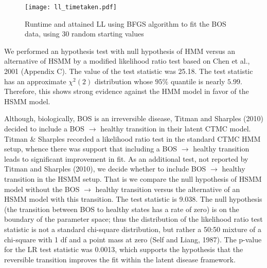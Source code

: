 \documentclass{uwstat572}
\begin{document}
\begin{table}
\centering
{}
\vspace{2mm}
\caption{This is a demonstration of non-identifiability of the likelihood for the BOS dataset. Two different parameter sets lead to approximately the same likelihood.}
\end{table}
\begin{figure}
\centering
\texttt{[image: ll\_timetaken.pdf]}
\caption{Runtime and attained LL using BFGS algorithm to fit the BOS data, using 30 random starting values}
\end{figure}


We performed an hypothesis test with null hypothesis of HMM versus an alternative of HSMM by a modified likelihood ratio test based on Chen et al., 2001 (Appendix C). The value of the test statistic was 25.18. The test statistic has an approximate $\chi^2(2)$ distribution whose $95\%$ quantile is nearly $5.99$. Therefore, this shows strong evidence against the HMM model in favor of the HSMM model.

Although, biologically, BOS is an irreversible disease, Titman and Sharples (2010) decided to include a BOS $\rightarrow$ healthy transition in their latent CTMC model. Titman \& Sharples recorded a likelihood ratio test in the standard CTMC HMM setup, whence there was support that including a BOS $\rightarrow$ healthy transition leads to significant improvement in fit. As an additional test, not reported by Titman and Sharples (2010), we decide whether to include BOS $\rightarrow$ healthy transition in the HSMM setup. That is we compare the null hypothesis of HSMM model without the BOS $\rightarrow$ healthy transition versus the alternative of an HSMM model with this transition. The test statistic is 9.038. The null hypothesis (the transition between BOS to healthy states has a rate of zero) is on the boundary of the parameter space; thus the distribution of the likelihood ratio test statistic is not a standard chi-square distribution, but rather a 50:50 mixture of a chi-square with 1 df and a point mass at zero (Self and Liang, 1987). The p-value for the LR test statistic was 0.0013, which supports the hypothesis that the reversible transition improves the fit within the latent disease framework.
\end{document}
